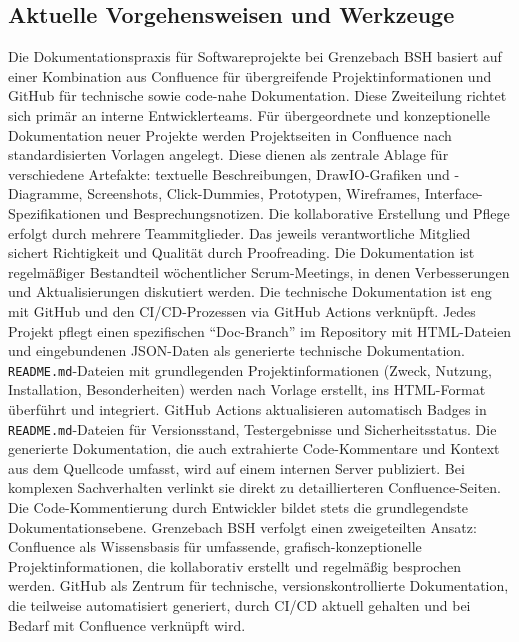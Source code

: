 \documentclass[12pt,oneside]{article}
\begin{document}
    \subsection{Aktuelle Vorgehensweisen und Werkzeuge}
    \label{subsec:dokument_werkzeuge}
    Die Dokumentationspraxis für Softwareprojekte bei Grenzebach BSH basiert auf einer Kombination aus Confluence für übergreifende Projektinformationen und GitHub für technische sowie code-nahe Dokumentation. Diese Zweiteilung richtet sich primär an interne Entwicklerteams.
    \newline
    Für übergeordnete und konzeptionelle Dokumentation neuer Projekte werden Projektseiten in Confluence nach standardisierten Vorlagen angelegt. Diese dienen als zentrale Ablage für verschiedene Artefakte: textuelle Beschreibungen, DrawIO-Grafiken und -Diagramme, Screenshots, Click-Dummies, Prototypen, Wireframes, Interface-Spezifikationen und Besprechungsnotizen. Die kollaborative Erstellung und Pflege erfolgt durch mehrere Teammitglieder. Das jeweils verantwortliche Mitglied sichert Richtigkeit und Qualität durch Proofreading. Die Dokumentation ist regelmäßiger Bestandteil wöchentlicher Scrum-Meetings, in denen Verbesserungen und Aktualisierungen diskutiert werden.
    \newline
    Die technische Dokumentation ist eng mit GitHub und den CI/CD-Prozessen via GitHub Actions verknüpft. Jedes Projekt pflegt einen spezifischen ``Doc-Branch'' im Repository mit HTML-Dateien und eingebundenen JSON-Daten als generierte technische Dokumentation. \texttt{README.md}-Dateien mit grundlegenden Projektinformationen (Zweck, Nutzung, Installation, Besonderheiten) werden nach Vorlage erstellt, ins HTML-Format überführt und integriert. GitHub Actions aktualisieren automatisch Badges in \texttt{README.md}-Dateien für Versionsstand, Testergebnisse und Sicherheitsstatus. Die generierte Dokumentation, die auch extrahierte Code-Kommentare und Kontext aus dem Quellcode umfasst, wird auf einem internen Server publiziert. Bei komplexen Sachverhalten verlinkt sie direkt zu detaillierteren Confluence-Seiten. Die Code-Kommentierung durch Entwickler bildet stets die grundlegendste Dokumentationsebene.
    \newline
    Grenzebach BSH verfolgt einen zweigeteilten Ansatz: Confluence als Wissensbasis für umfassende, grafisch-konzeptionelle Projektinformationen, die kollaborativ erstellt und regelmäßig besprochen werden. GitHub als Zentrum für technische, versionskontrollierte Dokumentation, die teilweise automatisiert generiert, durch CI/CD aktuell gehalten und bei Bedarf mit Confluence verknüpft wird.
\end{document}
